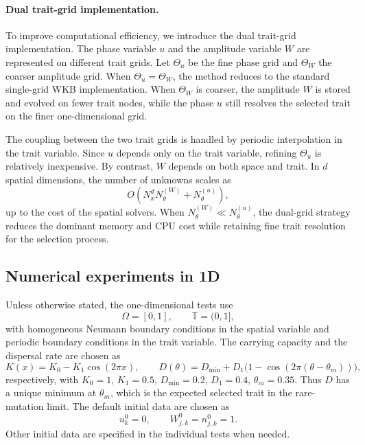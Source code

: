 \documentclass[11pt]{article}
\numberwithin{equation}{section}
\begin{document}
\paragraph{Dual trait-grid implementation.} To improve computational efficiency, we introduce the dual trait-grid
implementation.  The phase variable \(u\) and the amplitude variable \(W\) are
represented on different trait grids.  Let \(\Theta_u\) be the fine phase grid
and \(\Theta_W\) the coarser amplitude grid.  When
\(\Theta_u=\Theta_W\), the method reduces to the standard single-grid WKB
implementation.  When \(\Theta_W\) is coarser, the amplitude \(W\) is stored and
evolved on fewer trait nodes, while the phase \(u\) still resolves the selected
trait on the finer one-dimensional grid.

The coupling between the two trait grids is handled by periodic interpolation
in the trait variable.  Since \(u\) depends only on the trait variable,
refining \(\Theta_u\) is relatively inexpensive.  By contrast, \(W\) depends on
both space and trait.  In \(d\) spatial dimensions, the number of unknowns
scales as
\[
    O\!\left(N_x^d N_\theta^{(W)}+N_\theta^{(u)}\right),
\]
up to the cost of the spatial solvers.  When $N_\theta^{(W)} \ll N_\theta^{(u)}$, the dual-grid strategy reduces the
dominant memory and CPU cost while retaining fine trait resolution for the
selection process.



\subsection{Numerical experiments in 1D}
\label{subsec:numeric_1D}
Unless otherwise stated, the one-dimensional tests use
\[
    \Omega=[0,1],
    \qquad
    \mathbb T=(0,1],
\]
with homogeneous Neumann boundary conditions in the spatial variable and
periodic boundary conditions in the trait variable.  
The carrying capacity and the dispersal rate are chosen as 
\begin{equation}\label{eq:num_K_and_D}
    K(x)=K_0-K_1\cos(2\pi x),
    \qquad
    D(\theta) = D_{\min} + D_1\bigl(1-\cos(2\pi(\theta-\theta_m))\bigr),
\end{equation}
respectively, with $  K_0=1, \, K_1=0.5, \, D_{\min}=0.2,   \, D_1=0.4, \,   \theta_m=0.35$. 
Thus \(D\) has a unique minimum at \(\theta_m\), which is the expected selected
trait in the rare-mutation limit. 
The default initial data are chosen as 
\begin{equation}\label{eq:num_initial_W_new}
    u_k^0=0,
    \qquad
    W_{j,k}^0=n_{j,k}^0=1 .
\end{equation}
Other initial data are specified in the individual tests when needed.
\end{document}
